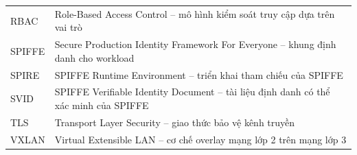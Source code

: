\begin{longtable}{@{}L{2cm}L{11.4cm}@{}}
RBAC & Role-Based Access Control -- mô hình kiểm soát truy cập dựa trên vai trò \\
SPIFFE & Secure Production Identity Framework For Everyone -- khung định danh cho workload \\
SPIRE & SPIFFE Runtime Environment -- triển khai tham chiếu của SPIFFE \\
SVID & SPIFFE Verifiable Identity Document -- tài liệu định danh có thể xác minh của SPIFFE \\
TLS & Transport Layer Security -- giao thức bảo vệ kênh truyền \\
VXLAN & Virtual Extensible LAN -- cơ chế overlay mạng lớp 2 trên mạng lớp 3 \\
\bottomrule
\end{longtable}
